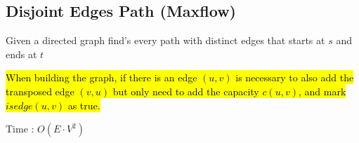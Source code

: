 \subsection{Disjoint Edges Path (Maxflow)}

Given a directed graph find's every path with distinct edges that starts at $s$ and ends at $t$


\hl{When building the graph, if there is an edge $(u, v)$ is necessary to also add the transposed edge $(v, u)$ but only need to add the capacity $c(u, v)$, and mark $isedge(u,v)$ as true.}

Time : $O(E \cdot V^2) $
